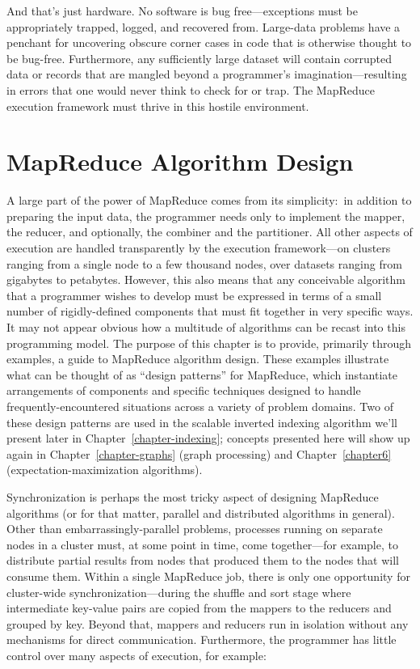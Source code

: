 \documentclass[11pt]{article}
\begin{document}
And that's just hardware.  No software is bug free---exceptions must
be appropriately trapped, logged, and recovered from.  Large-data
problems have a penchant for uncovering obscure corner cases in code
that is otherwise thought to be bug-free.  Furthermore, any
sufficiently large dataset will contain corrupted data or records that
are mangled beyond a programmer's imagination---resulting in errors
that one would never think to check for or trap.  The MapReduce
execution framework must thrive in this hostile environment.

\section{MapReduce Algorithm Design}
\label{chapter3}

\noindent A large part of the power of MapReduce comes from its simplicity:\ in
addition to preparing the input data, the programmer needs only to
implement the mapper, the reducer, and optionally, the combiner and
the partitioner.  All other aspects of execution are handled
transparently by the execution framework---on clusters ranging from a
single node to a few thousand nodes, over datasets ranging from
gigabytes to petabytes.  However, this also means that any conceivable
algorithm that a programmer wishes to develop must be expressed in
terms of a small number of rigidly-defined components that must fit
together in very specific ways.  It may not appear obvious how a
multitude of algorithms can be recast into this programming model.
The purpose of this chapter is to provide, primarily through examples,
a guide to MapReduce algorithm design.  These examples illustrate what
can be thought of as ``design patterns'' for MapReduce, which
instantiate arrangements of components and specific techniques
designed to handle frequently-encountered situations across a variety
of problem domains.  Two of these design patterns are used in the
scalable inverted indexing algorithm we'll present later in
Chapter~\ref{chapter-indexing}; concepts presented here will show up
again in Chapter~\ref{chapter-graphs} (graph processing) and
Chapter~\ref{chapter6} (expectation-maximization algorithms).

Synchronization is perhaps the most tricky aspect of designing
MapReduce algorithms (or for that matter, parallel and distributed
algorithms in general).  Other than embarrassingly-parallel problems,
processes running on separate nodes in a cluster must, at some point
in time, come together---for example, to distribute partial results
from nodes that produced them to the nodes that will consume them.
Within a single MapReduce job, there is only one opportunity for
cluster-wide synchronization---during the shuffle and sort stage where
intermediate key-value pairs are copied from the mappers to the
reducers and grouped by key.  Beyond that, mappers and reducers run in
isolation without any mechanisms for direct communication.
Furthermore, the programmer has little control over many aspects of
execution, for example:
\end{document}
